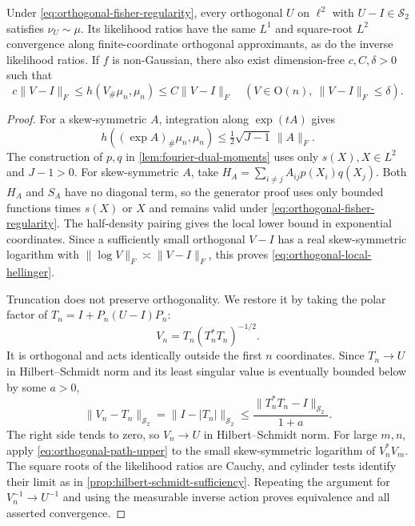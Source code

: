 \begin{proposition}
\label{prop:orthogonal-sufficiency}
Under \eqref{eq:orthogonal-fisher-regularity}, every
orthogonal $U$ on $\ell^2$ with $U-I\in\mathcal S_2$ satisfies
$\nu_U\sim\mu$.  Its likelihood ratios have the same $L^1$ and
square-root $L^2$ convergence along finite-coordinate orthogonal
approximants, as do the inverse likelihood ratios.
If $f$ is non-Gaussian, there also exist dimension-free
$c,C,\delta>0$ such that
\begin{equation}
 c\|V-I\|_F\le h(V_\#\mu_n,\mu_n)
                   \le C\|V-I\|_F
 \quad(V\in\mathrm O(n),\ \|V-I\|_F\le\delta).
 \label{eq:orthogonal-local-hellinger}
\end{equation}
\end{proposition}

\begin{proof}
For a skew-symmetric $A$, integration along $\exp(tA)$ gives
\begin{equation}
 h((\exp A)_\#\mu_n,\mu_n)
 \le\tfrac12\sqrt{J-1}\,\|A\|_F.
 \label{eq:orthogonal-path-upper}
\end{equation}
The construction of $p,q$ in \cref{lem:fourier-dual-moments} uses only
$s(X),X\in L^2$ and $J-1>0$.  For skew-symmetric $A$, take
$H_A=\sum_{i\ne j}A_{ij}p(X_i)q(X_j)$.  Both $H_A$ and $S_A$ have no
diagonal term, so the generator proof uses only bounded functions times
$s(X)$ or $X$ and remains valid under
\eqref{eq:orthogonal-fisher-regularity}.  The half-density pairing gives the
local lower bound in exponential coordinates.  Since a sufficiently small
orthogonal $V-I$ has a real skew-symmetric logarithm with
$\|\log V\|_F\asymp\|V-I\|_F$, this proves
\eqref{eq:orthogonal-local-hellinger}.

Truncation does not preserve orthogonality. We restore it by taking the
polar factor of $T_n=I+P_n(U-I)P_n$:
\[
 V_n=T_n(T_n^*T_n)^{-1/2}.
\]
It is orthogonal and acts identically outside the first $n$
coordinates.  Since $T_n\to U$ in Hilbert--Schmidt norm and its least
singular value is eventually bounded below by some $a>0$,
\[
 \|V_n-T_n\|_{\mathcal S_2}
 =\|I-|T_n|\|_{\mathcal S_2}
 \le\frac{\|T_n^*T_n-I\|_{\mathcal S_2}}{1+a}.
\]
The right side tends to zero, so $V_n\to U$ in Hilbert--Schmidt norm.
For large $m,n$, apply \eqref{eq:orthogonal-path-upper} to the small
skew-symmetric logarithm of $V_n^*V_m$.  The square roots of the likelihood
ratios are Cauchy, and cylinder tests identify their limit as in
\cref{prop:hilbert-schmidt-sufficiency}.  Repeating the argument for
$V_n^{-1}\to U^{-1}$ and using the measurable inverse action proves
equivalence and all asserted convergence.
\end{proof}

